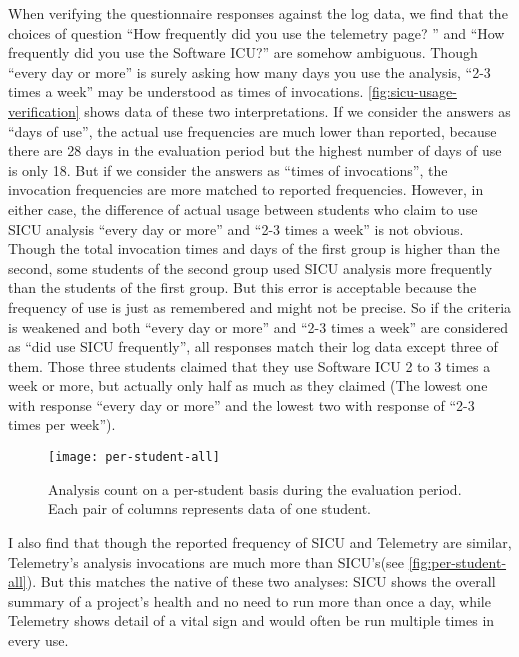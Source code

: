 When verifying the questionnaire responses against the log data, we find that the choices of question ``How frequently did you use the telemetry page? '' and ``How frequently did you use the Software ICU?'' are somehow ambiguous. Though ``every day or more'' is surely asking how many days you use the analysis, ``2-3 times a week'' may be understood as times of invocations. \autoref{fig:sicu-usage-verification} shows data of these two interpretations. If we consider the answers as ``days of use'', the actual use frequencies are much lower than reported, because there are 28 days in the evaluation period but the highest number of days of use is only 18. But if we consider the answers as ``times of invocations'', the invocation frequencies are more matched to reported frequencies. However, in either case, the difference of actual usage between students who claim to use SICU analysis ``every day or more'' and ``2-3 times a week'' is not obvious. Though the total invocation times and days of the first group is higher than the second, some students of the second group used SICU analysis more frequently than the students of the first group. But this error is acceptable because the frequency of use is just as remembered and might not be precise. So if the criteria is weakened and both ``every day or more'' and ``2-3 times a week'' are considered as ``did use SICU frequently'', all responses match their log data except three of them. Those three students claimed that they use Software ICU 2 to 3 times a week or more, but actually only half as much as they claimed (The lowest one with response ``every day or more'' and the lowest two with response of ``2-3 times per week'').

\begin{figure}[htbp] %
   \centering
   \texttt{[image: per-student-all]} 
   \caption[Analysis count on a per-student basis]{Analysis count on a per-student basis during the evaluation period. Each pair of columns represents data of one student.}
   \label{fig:per-student-all}
\end{figure}

I also find that though the reported frequency of SICU and Telemetry are similar, Telemetry's analysis invocations are much more than SICU's(see \autoref{fig:per-student-all}). But this matches the native of these two analyses: SICU shows the overall summary of a project's health and no need to run more than once a day, while Telemetry shows detail of a vital sign and would often be run multiple times in every use. 

